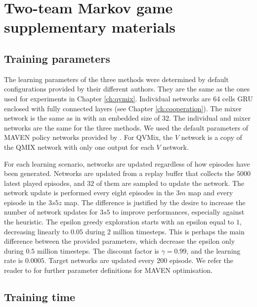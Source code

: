 \chapter{Two-team Markov game supplementary materials} \label{ch:ch7_appendix}
\section{Training parameters}
\label{app:train_param}
The learning parameters of the three methods were determined by default configurations provided by their different authors.
They are the same as the ones used for experiments in Chapter \ref{ch:qvmix}.
Individual networks are 64 cells GRU enclosed with fully connected layers (see Chapter \ref{ch:cooperation}).
The mixer network is the same as in \citep{Rashid2018} with an embedded size of 32.
The individual and mixer networks are the same for the three methods.
We used the default parameters of MAVEN policy networks provided by \citep{Mahajan2019MAVEN:Exploration}.
For QVMix, the $V$ network is a copy of the QMIX network with only one output for each $V$ network.

For each learning scenario, networks are updated regardless of how episodes have been generated.
Networks are updated from a replay buffer that collects the $5000$ latest played episodes, and $32$ of them are sampled to update the network.
The network update is performed every eight episodes in the $3m$ map and every episode in the $3s5z$ map.
The difference is justified by the desire to increase the number of network updates for $3s5$ to improve performances, especially against the heuristic.
The epsilon greedy exploration starts with an epsilon equal to $1$, decreasing linearly to $0.05$ during $2$ million timesteps.
This is perhaps the main difference between the provided parameters, which decrease the epsilon only during $0.5$ million timesteps.
The discount factor is $\gamma = 0.99$, and the learning rate is $0.0005$.
Target networks are updated every $200$ episode.
We refer the reader to \citep{Mahajan2019MAVEN:Exploration} for further parameter definitions for MAVEN optimisation.

\section{Training time}
\label{app:train_time}

